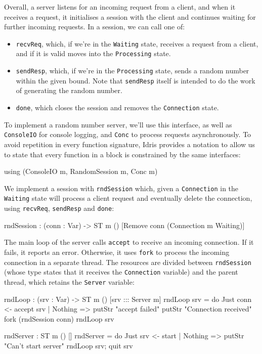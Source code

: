 Overall, a server listens for an incoming request from a client, 
and when it receives a request, it initialises a session with the client
and continues waiting for further incoming requests. In a session, we can
call one of:

\begin{itemize}
\item \texttt{recvReq}, which, if we're in the \texttt{Waiting} state,
receives a request from a client, and if it is valid moves into the
\texttt{Processing} state.
\item \texttt{sendResp}, which, if we're in the \texttt{Processing} state,
sends a random number within the given bound. Note that \texttt{sendResp}
itself is intended to do the work of generating the random number.
\item \texttt{done}, which closes the session and removes the \texttt{Connection}
state.
\end{itemize}

To implement a random number server, we'll use this interface, as well
as \texttt{ConsoleIO} for console logging, and \texttt{Conc} to process
requests asynchronously. To avoid repetition in every function signature,
Idris provides a notation to allow us to state that every function in a
block is constrained by the same interfaces:

\small
\begin{code}
using (ConsoleIO m, RandomSession m, Conc m)
\end{code}
\normalsize

We implement a session with \texttt{rndSession} which, given a
\texttt{Connection} in the \texttt{Waiting} state will process a client
request and eventually delete the connection, using \texttt{recvReq},
\texttt{sendResp} and \texttt{done}:

\small
\begin{code}
rndSession : (conn : Var) -> ST m () [Remove conn (Connection {m} Waiting)]
\end{code}
\normalsize

The main loop of the server calls \texttt{accept} to receive an incoming
connection. If it fails, it reports an error. Otherwise, it uses
\texttt{fork} to process the incoming connection in a separate thread.
The resources are divided between \texttt{rndSession} (whose type states that
it receives the \texttt{Connection} variable) and the parent thread, which
retains the \texttt{Server} variable:

\small
\begin{code}
rndLoop : (srv : Var) -> ST m () [srv ::: Server {m}]
rndLoop srv = do Just conn <- accept srv | Nothing => putStr "accept failed\n"
                 putStr "Connection received\n"
                 fork (rndSession conn)
                 rndLoop srv
  
rndServer : ST m () []
rndServer = do Just srv <- start | Nothing => putStr "Can't start server\n"
               rndLoop srv; quit srv
\end{code}
\normalsize

